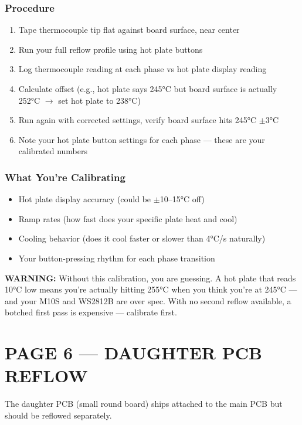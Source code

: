 \documentclass[11pt,a4paper]{article}
\newcommand{\dangerbox}[1]{\par\noindent\colorbox{danger!10}{\parbox{\dimexpr\textwidth-2\fboxsep}{%
\textcolor{danger}{\textbf{WARNING:}} #1}}\par\vspace{0.5em}}
\begin{document}
\subsubsection*{Procedure}
\begin{enumerate}[nosep]
\item Tape thermocouple tip flat against board surface, near center
\item Run your full reflow profile using hot plate buttons
\item Log thermocouple reading at each phase vs hot plate display reading
\item Calculate offset (e.g., hot plate says 245°C but board surface is actually 252°C $\rightarrow$ set hot plate to 238°C)
\item Run again with corrected settings, verify board surface hits 245°C $\pm$3°C
\item Note your hot plate button settings for each phase — these are your calibrated numbers
\end{enumerate}

\subsubsection*{What You're Calibrating}
\begin{itemize}[nosep]
\item Hot plate display accuracy (could be $\pm$10--15°C off)
\item Ramp rates (how fast does your specific plate heat and cool)
\item Cooling behavior (does it cool faster or slower than 4°C/s naturally)
\item Your button-pressing rhythm for each phase transition
\end{itemize}

\dangerbox{Without this calibration, you are guessing. A hot plate that reads 10°C low means you're actually hitting 255°C when you think you're at 245°C — and your M10S and WS2812B are over spec. With no second reflow available, a botched first pass is expensive — calibrate first.}

\newpage
\section*{PAGE 6 — DAUGHTER PCB REFLOW}

The daughter PCB (small round board) ships attached to the main PCB but should be reflowed separately.
\end{document}
